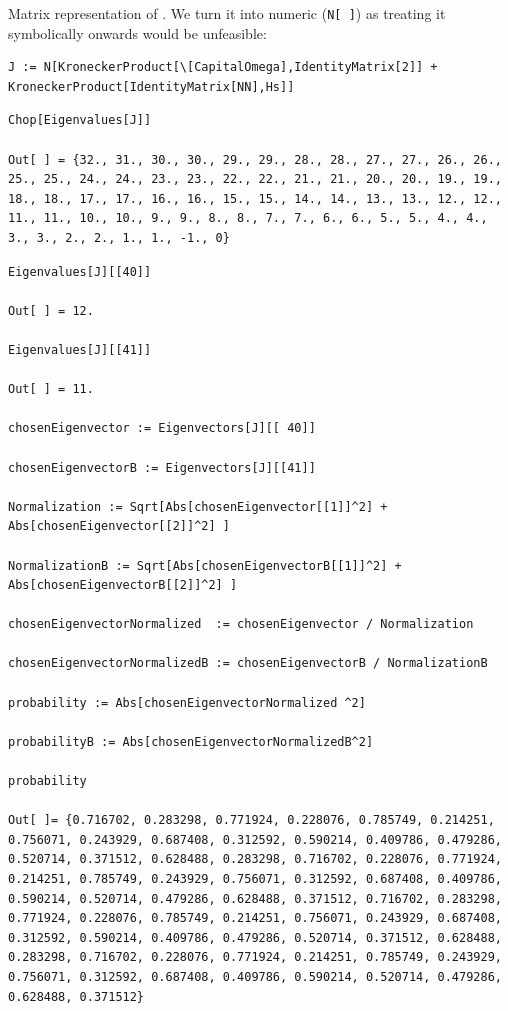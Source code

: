 Matrix representation of \cite[Eq. 1]{Lloyd:Time}.
We turn it into numeric (\verb!N[ ]!) as treating  it symbolically onwards would be unfeasible:
\begin{Verbatim}
J := N[KroneckerProduct[\[CapitalOmega],IdentityMatrix[2]] + KroneckerProduct[IdentityMatrix[NN],Hs]]
\end{Verbatim}
\begin{Verbatim}
Chop[Eigenvalues[J]]

Out[ ] = {32., 31., 30., 30., 29., 29., 28., 28., 27., 27., 26., 26., 25., 25., 24., 24., 23., 23., 22., 22., 21., 21., 20., 20., 19., 19., 18., 18., 17., 17., 16., 16., 15., 15., 14., 14., 13., 13., 12., 12., 11., 11., 10., 10., 9., 9., 8., 8., 7., 7., 6., 6., 5., 5., 4., 4., 3., 3., 2., 2., 1., 1., -1., 0}
\end{Verbatim}
\begin{Verbatim}
Eigenvalues[J][[40]]

Out[ ] = 12.

Eigenvalues[J][[41]]

Out[ ] = 11.

chosenEigenvector := Eigenvectors[J][[ 40]]

chosenEigenvectorB := Eigenvectors[J][[41]]

Normalization := Sqrt[Abs[chosenEigenvector[[1]]^2] + Abs[chosenEigenvector[[2]]^2] ]

NormalizationB := Sqrt[Abs[chosenEigenvectorB[[1]]^2] + Abs[chosenEigenvectorB[[2]]^2] ]

chosenEigenvectorNormalized  := chosenEigenvector / Normalization

chosenEigenvectorNormalizedB := chosenEigenvectorB / NormalizationB  

probability := Abs[chosenEigenvectorNormalized ^2]

probabilityB := Abs[chosenEigenvectorNormalizedB^2]

probability

Out[ ]= {0.716702, 0.283298, 0.771924, 0.228076, 0.785749, 0.214251, 0.756071, 0.243929, 0.687408, 0.312592, 0.590214, 0.409786, 0.479286, 0.520714, 0.371512, 0.628488, 0.283298, 0.716702, 0.228076, 0.771924, 0.214251, 0.785749, 0.243929, 0.756071, 0.312592, 0.687408, 0.409786, 0.590214, 0.520714, 0.479286, 0.628488, 0.371512, 0.716702, 0.283298, 0.771924, 0.228076, 0.785749, 0.214251, 0.756071, 0.243929, 0.687408, 0.312592, 0.590214, 0.409786, 0.479286, 0.520714, 0.371512, 0.628488, 0.283298, 0.716702, 0.228076, 0.771924, 0.214251, 0.785749, 0.243929, 0.756071, 0.312592, 0.687408, 0.409786, 0.590214, 0.520714, 0.479286, 0.628488, 0.371512}


\end{Verbatim}
